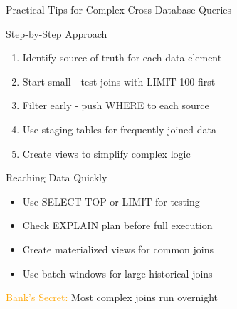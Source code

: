 \documentclass{beamer}
\begin{document}
	
	\begin{frame}{Practical Tips for Complex Cross-Database Queries}
		\begin{block}{Step-by-Step Approach}
			\begin{enumerate}
				\small
				\item Identify source of truth for each data element
				\item Start small - test joins with LIMIT 100 first
				\item Filter early - push WHERE to each source
				\item Use staging tables for frequently joined data
				\item Create views to simplify complex logic
			\end{enumerate}
		\end{block}
		
		\begin{example}{Reaching Data Quickly}
			\begin{itemize}
				\small
				\item Use SELECT TOP or LIMIT for testing
				\item Check EXPLAIN plan before full execution
				\item Create materialized views for common joins
				\item Use batch windows for large historical joins
			\end{itemize}
		\end{example}
		
		\begin{center}
			\textcolor{orange}{Bank's Secret:} Most complex joins run overnight
		\end{center}
	\end{frame}
	
\end{document}
